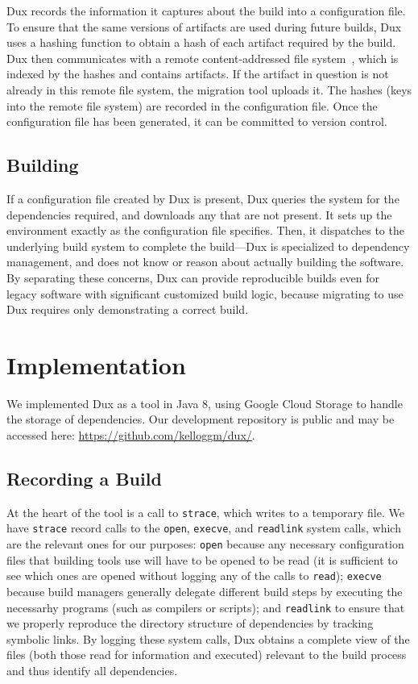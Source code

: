 \documentclass[10pt,conference]{IEEEtran}
\begin{document}
Dux records the information it captures about the build into a configuration file.
To ensure that the same versions of artifacts are used during future builds,
Dux uses a hashing function to obtain a hash of each artifact required by the build.
Dux then communicates with a remote content-addressed file system~\cite{venti},
which is indexed by the hashes and contains artifacts.
If the artifact in question is not already in this remote file system, the migration tool uploads it.
The hashes (keys into the remote file system) are recorded in the configuration file.
Once the configuration file has been generated, it can be committed to version control.

\subsection{Building}

If a configuration file created by Dux is present, Dux queries the system for the dependencies required,
and downloads any that are not present.
It sets up the environment exactly as the configuration file specifies.
Then, it dispatches to the underlying build system to complete the build---Dux is specialized
to dependency management, and does not know or reason about actually building the software.
By separating these concerns, Dux can provide reproducible builds even for legacy software
with significant customized build logic, because migrating to use Dux requires only
demonstrating a correct build.

\section{Implementation}

We implemented Dux as a tool in Java 8, using Google Cloud Storage to handle the storage of dependencies.
Our development repository is public and may be accessed here: \url{https://github.com/kelloggm/dux/}.

\subsection{Recording a Build}
At the heart of the tool is a call to \texttt{strace}, which writes to a temporary file. We have \texttt{strace}
record calls to the \texttt{open}, \texttt{execve}, and \texttt{readlink} system calls, which are the relevant
ones for our purposes: \texttt{open} because any necessary configuration files that building tools use will
have to be opened to be read (it is sufficient to see which ones are opened without logging any of the
calls to \texttt{read}); \texttt{execve} because build managers generally delegate different build steps by
executing the necessarhy programs (such as compilers or scripts); and \texttt{readlink} to ensure that we
properly reproduce the directory structure of dependencies by tracking symbolic links. By logging these system
calls, Dux obtains a complete view of the files (both those read for information and executed) relevant to the
build process and thus identify all dependencies.
\end{document}

